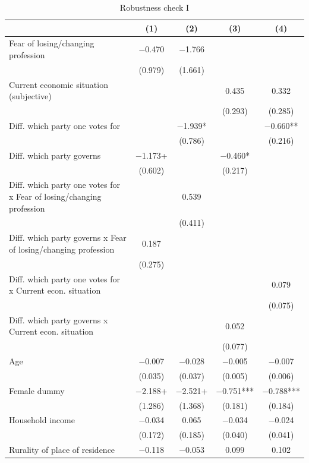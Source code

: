 \documentclass[
]{article}
\begin{document}
\begin{table}[!h]

\caption{\label{tab:regression-results1-robustness1}Robustness check I}
\centering
\begin{tabular}[t]{lcccc}
\toprule
  & (1) & (2) & (3) & (4)\\
\midrule
Fear of losing/changing profession & \num{-0.470} & \num{-1.766} &  & \\
 & (\num{0.979}) & (\num{1.661}) &  & \\
Current economic situation (subjective) &  &  & \num{0.435} & \num{0.332}\\
 &  &  & (\num{0.293}) & (\num{0.285})\\
Diff. which party one votes for &  & \num{-1.939}* &  & \num{-0.660}**\\
 &  & (\num{0.786}) &  & (\num{0.216})\\
Diff. which party governs & \num{-1.173}+ &  & \num{-0.460}* & \\
 & (\num{0.602}) &  & (\num{0.217}) & \\
Diff. which party one votes for x Fear of losing/changing profession &  & \num{0.539} &  & \\
 &  & (\num{0.411}) &  & \\
Diff. which party governs x Fear of losing/changing profession & \num{0.187} &  &  & \\
 & (\num{0.275}) &  &  & \\
Diff. which party one votes for x Current econ. situation &  &  &  & \num{0.079}\\
 &  &  &  & (\num{0.075})\\
Diff. which party governs x Current econ. situation &  &  & \num{0.052} & \\
 &  &  & (\num{0.077}) & \\
Age & \num{-0.007} & \num{-0.028} & \num{-0.005} & \num{-0.007}\\
 & (\num{0.035}) & (\num{0.037}) & (\num{0.005}) & (\num{0.006})\\
Female dummy & \num{-2.188}+ & \num{-2.521}+ & \num{-0.751}*** & \num{-0.788}***\\
 & (\num{1.286}) & (\num{1.368}) & (\num{0.181}) & (\num{0.184})\\
Household income & \num{-0.034} & \num{0.065} & \num{-0.034} & \num{-0.024}\\
 & (\num{0.172}) & (\num{0.185}) & (\num{0.040}) & (\num{0.041})\\
Rurality of place
of residence & \num{-0.118} & \num{-0.053} & \num{0.099} & \num{0.102}\\

\end{tabular}
\end{table}
\end{document}
